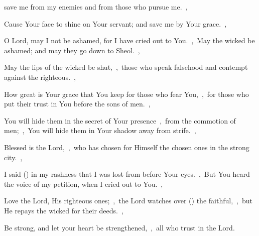 \documentclass[12pt,twoside,a5paper]{article}
\begin{document}
\begin{normalparskip}
  save me from my enemies and from those who pursue me.~\sep

  Cause Your face to shine on Your servant; and save me by Your grace.~\sep

  O Lord, may I not be ashamed, for I have cried out to You.~\sep\ May the wicked be ashamed; and may they go down to Sheol.~\sep

  May the lips of the wicked be shut,~\sep\ those who speak falsehood and contempt against the righteous.~\sep

  How great is Your grace that You keep for those who fear You,~\sep\ for those who put their trust in You before the sons of men.~\sep

  You will hide them in the secret of Your presence~\sep\ from the commotion of men;~\sep\ You will hide them in Your shadow away from strife.~\sep

  Blessed is the Lord,~\sep\ who has chosen for Himself the chosen ones in the strong city.~\sep

  I said () in my rashness that I was lost from before Your eyes.~\sep\ But You heard the voice of my petition, when I cried out to You.~\sep

  Love the Lord, His righteous ones;~\sep\ the Lord watches over () the faithful,~\sep\ but He repays the wicked for their deeds.~\sep

  Be strong, and let your heart be strengthened,~\sep\ all who trust in the Lord.
\end{normalparskip}

\end{document}
